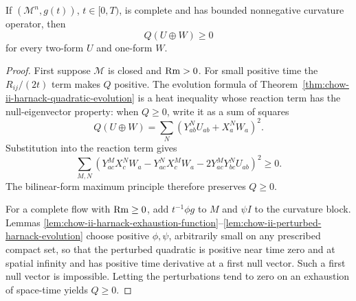 \begin{theorem}
\label{thm:chow-ii-hamilton-matrix-harnack}


If \((\mathcal M^n,g(t))\), \(t\in[0,T)\), is complete and has bounded
nonnegative curvature operator, then
\[
Q(U\oplus W)\ge0
\]
for every two-form \(U\) and one-form \(W\).
\end{theorem}
\begin{proof}
\sketch First suppose \(\mathcal M\) is closed and \(\operatorname{Rm}>0\).  For small positive
time the \(R_{ij}/(2t)\) term makes \(Q\) positive.  The evolution formula of
Theorem~\ref{thm:chow-ii-harnack-quadratic-evolution} is a heat inequality
whose reaction term has the null-eigenvector property: when \(Q\ge0\), write
it as a sum of squares
\[
Q(U\oplus W)=\sum_N(Y^N_{ab}U_{ab}+X^N_aW_a)^2.
\]
Substitution into the reaction term gives
\[
\sum_{M,N}(Y^M_{ac}X^N_cW_a-Y^N_{ac}X^M_cW_a
-2Y^M_{ac}Y^N_{bc}U_{ab})^2\ge0.
\]
The bilinear-form maximum principle therefore preserves \(Q\ge0\).

For a complete flow with \(\operatorname{Rm}\ge0\), add \(t^{-1}\phi g\) to \(M\) and
\(\psi I\) to the curvature block.  Lemmas
\ref{lem:chow-ii-harnack-exhaustion-function}--\ref{lem:chow-ii-perturbed-harnack-evolution}
choose positive \(\phi,\psi\), arbitrarily small on any prescribed compact
set, so that the perturbed quadratic is positive near time zero and at spatial
infinity and has positive time derivative at a first null vector.  Such a
first null vector is impossible.  Letting the perturbations tend to zero on
an exhaustion of space-time yields \(Q\ge0\).
\end{proof}


